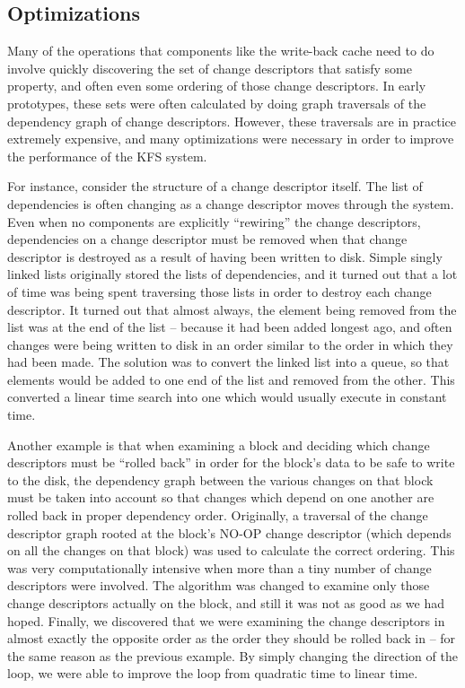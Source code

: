 \subsection {Optimizations}
Many of the operations that components like the write-back cache need to do
involve quickly discovering the set of change descriptors that satisfy some
property, and often even some ordering of those change descriptors. In early
prototypes, these sets were often calculated by doing graph traversals of the
dependency graph of change descriptors. However, these traversals are in
practice extremely expensive, and many optimizations were necessary in order to
improve the performance of the KFS system.

For instance, consider the structure of a change descriptor itself. The list of
dependencies is often changing as a change descriptor moves through the system.
Even when no components are explicitly ``rewiring'' the change descriptors,
dependencies on a change descriptor must be removed when that change descriptor
is destroyed as a result of having been written to disk. Simple singly linked
lists originally stored the lists of dependencies, and it turned out that a lot
of time was being spent traversing those lists in order to destroy each change
descriptor. It turned out that almost always, the element being removed from the
list was at the end of the list -- because it had been added longest ago, and
often changes were being written to disk in an order similar to the order in
which they had been made. The solution was to convert the linked list into a
queue, so that elements would be added to one end of the list and removed from
the other. This converted a linear time search into one which would usually
execute in constant time.

Another example is that when examining a block and deciding which change
descriptors must be ``rolled back'' in order for the block's data to be safe to
write to the disk, the dependency graph between the various changes on that
block must be taken into account so that changes which depend on one another are
rolled back in proper dependency order. Originally, a traversal of the change
descriptor graph rooted at the block's NO-OP change descriptor (which depends on
all the changes on that block) was used to calculate the correct ordering. This
was very computationally intensive when more than a tiny number of change
descriptors were involved. The algorithm was changed to examine only those
change descriptors actually on the block, and still it was not as good as we had
hoped. Finally, we discovered that we were examining the change descriptors in
almost exactly the opposite order as the order they should be rolled back in --
for the same reason as the previous example. By simply changing the direction of
the loop, we were able to improve the loop from quadratic time to linear time.


